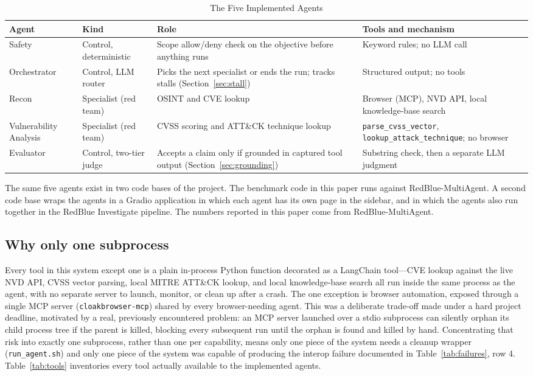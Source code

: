 \documentclass[conference]{IEEEtran}
\begin{document}
\begin{table}[t]
\caption{The Five Implemented Agents}
\label{tab:agents}
\centering
\begin{tabular}{@{}llp{4.2cm}p{6.0cm}@{}}
\toprule
\textbf{Agent} & \textbf{Kind} & \textbf{Role} & \textbf{Tools and mechanism} \\
\midrule
Safety & Control, deterministic & Scope allow/deny check on the objective before anything runs & Keyword rules; no LLM call \\
Orchestrator & Control, LLM router & Picks the next specialist or ends the run; tracks stalls (Section~\ref{sec:stall}) & Structured output; no tools \\
Recon & Specialist (red team) & OSINT and CVE lookup & Browser (MCP), NVD API, local knowledge-base search \\
Vulnerability Analysis & Specialist (red team) & CVSS scoring and ATT\&CK technique lookup & \texttt{parse\_cvss\_vector}, \texttt{lookup\_attack\_technique}; no browser \\
Evaluator & Control, two-tier judge & Accepts a claim only if grounded in captured tool output (Section~\ref{sec:grounding}) & Substring check, then a separate LLM judgment \\
\bottomrule
\end{tabular}
\end{table}

The same five agents exist in two code bases of the project. The benchmark
code in this paper runs against RedBlue-MultiAgent. A second code base wraps
the agents in a Gradio application in which each agent has its own page in
the sidebar, and in which the agents also run together in the RedBlue
Investigate pipeline. The numbers reported in this paper come from
RedBlue-MultiAgent.

\subsection{Why only one subprocess}
\label{sec:subprocess}

Every tool in this system except one is a plain in-process Python function
decorated as a LangChain tool---CVE lookup against the live NVD API, CVSS
vector parsing, local MITRE ATT\&CK lookup, and local knowledge-base search
all run inside the same process as the agent, with no separate server to
launch, monitor, or clean up after a crash. The one exception is browser
automation, exposed through a single MCP server (\texttt{cloakbrowser-mcp})
shared by every browser-needing agent. This was a deliberate trade-off made
under a hard project deadline, motivated by a real, previously encountered
problem: an MCP server launched over a stdio subprocess can silently orphan
its child process tree if the parent is killed, blocking every subsequent
run until the orphan is found and killed by hand. Concentrating that risk
into exactly one subprocess, rather than one per capability, means only one
piece of the system needs a cleanup wrapper (\texttt{run\_agent.sh}) and
only one piece of the system was capable of producing the interop failure
documented in Table~\ref{tab:failures}, row 4. Table~\ref{tab:tools}
inventories every tool actually available to the implemented agents.
\end{document}
